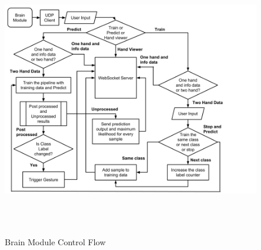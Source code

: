 \begin{figure}
	[h] \centering 
	\includegraphics[height=12cm]{figures/content/brain-flow.jpg} \caption{Brain Module Control Flow} \label{fg:brain:flow} 
\end{figure}
